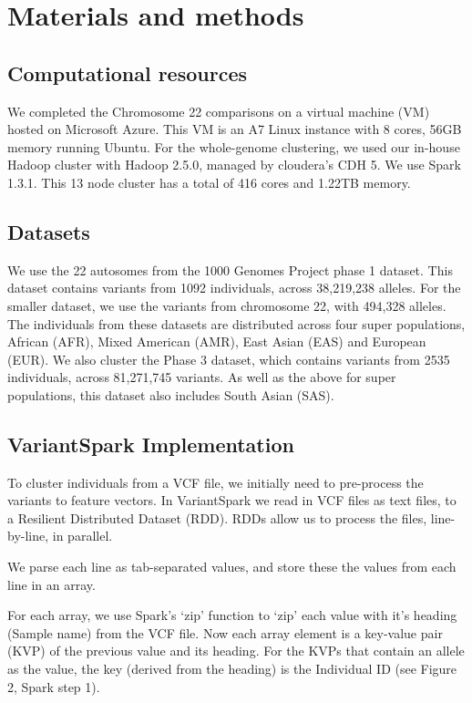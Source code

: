 \documentclass{bmcart}
\newcommand{\variantSpark}{{\sc VariantSpark}}
\begin{document}
\section*{Materials and methods}
\subsection*{Computational resources}
We completed the Chromosome 22 comparisons on a virtual machine (VM) hosted on Microsoft Azure. This VM is an A7 Linux instance with 8 cores, 56GB
memory running Ubuntu. 
For the whole-genome clustering, we used our in-house Hadoop cluster with Hadoop 2.5.0, managed by cloudera's CDH 5. We use Spark 1.3.1. This 13 node
cluster has a total of 416 cores and 1.22TB memory.


\subsection*{Datasets}
We use the 22 autosomes from the 1000 Genomes Project phase 1 dataset. This dataset contains variants from 1092 individuals, across 38,219,238 alleles.
For the smaller dataset, we use the variants from chromosome 22, with 494,328 alleles.
The individuals from these datasets are distributed across four super populations, African (AFR), Mixed American (AMR), East Asian (EAS) and European (EUR).
We also cluster the Phase 3 dataset, which contains variants from 2535 individuals, across 81,271,745 variants. As well as the above for super populations, this
dataset also includes South Asian (SAS).



\subsection*{VariantSpark Implementation}
To cluster individuals from a VCF file, we initially need to pre-process the variants to feature vectors.
In \variantSpark{} we read in VCF files as text files, to a Resilient Distributed Dataset (RDD). RDDs allow us to process the files, line-by-line, in parallel.

We parse each line as tab-separated values, and store these the values from each line in an array.

For each array, we use Spark's `zip' function to `zip' each value with it's heading (Sample name) from the VCF file. Now each array element is a
key-value pair (KVP) of the previous value and its heading. For the KVPs that contain an allele as the value, the key (derived from the heading) is
the Individual ID (see Figure 2, Spark step 1).
\end{document}
